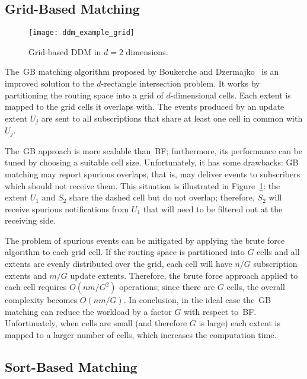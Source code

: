 \documentclass[10pt, conference, compsocconf]{IEEEtran}
\begin{document}
\subsection{Grid-Based Matching}\label{sec:grid-based-matching}

\begin{figure}[t]
\centering\texttt{[image: ddm\_example\_grid]}
\caption{Grid-based DDM in $d=2$ dimensions.}\label{fig:ddm_example_grid}
\end{figure}

The~\acf{GB} matching algorithm proposed by Boukerche and
Dzermajko~\cite{Boukerche2001} is an improved solution to the
$d$-rectangle intersection problem. It works by partitioning the
routing space into a grid of $d$-dimensional cells. Each extent is
mapped to the grid cells it overlaps with. The events produced by an
update extent $U_j$ are sent to all subscriptions that share at least
one cell in common with $U_j$.

The~\ac{GB} approach is more scalable than~\ac{BF}; furthermore, its
performance can be tuned by choosing a suitable cell
size. Unfortunately, it has some drawbacks: \ac{GB} matching may
report spurious overlaps, that is, may deliver events to subscribers
which should not receive them. This situation is illustrated in
Figure~\ref{fig:ddm_example_grid}: the extent $U_1$ and $S_2$ share
the dashed cell but do not overlap; therefore, $S_2$ will receive
spurious notifications from $U_1$ that will need to be filtered out at
the receiving side.

The problem of spurious events can be mitigated by applying the brute
force algorithm to each grid cell. If the routing space is partitioned
into $G$ cells and all extents are evenly distributed over the grid,
each cell will have $n/G$ subscription extents and $m/G$ update
extents. Therefore, the brute force approach applied to each cell
requires $O(nm / G^2)$ operations; since there are $G$ cells, the
overall complexity becomes $O(nm / G)$. In conclusion, in the ideal
case the~\ac{GB} matching can reduce the workload by a factor $G$ with
respect to~\ac{BF}. Unfortunately, when cells are small (and therefore
$G$ is large) each extent is mapped to a larger number of cells, which
increases the computation time.

\subsection{Sort-Based Matching}\label{sec:sort-based}
\end{document}

